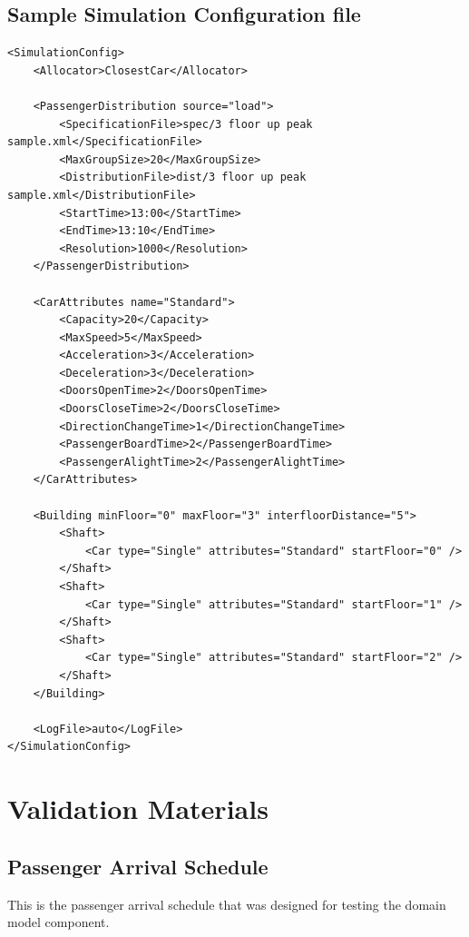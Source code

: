 \documentclass{UoYCSproject}
\begin{document}
\begin{appendices}
\subsection{Sample Simulation Configuration file}

\begin{lstlisting}
<SimulationConfig>
	<Allocator>ClosestCar</Allocator>
	
	<PassengerDistribution source="load">
		<SpecificationFile>spec/3 floor up peak sample.xml</SpecificationFile>
		<MaxGroupSize>20</MaxGroupSize>
		<DistributionFile>dist/3 floor up peak sample.xml</DistributionFile>
		<StartTime>13:00</StartTime>
		<EndTime>13:10</EndTime>
		<Resolution>1000</Resolution>
	</PassengerDistribution>
	
	<CarAttributes name="Standard">
		<Capacity>20</Capacity>
		<MaxSpeed>5</MaxSpeed>
		<Acceleration>3</Acceleration>
		<Deceleration>3</Deceleration>
		<DoorsOpenTime>2</DoorsOpenTime>
		<DoorsCloseTime>2</DoorsCloseTime>
		<DirectionChangeTime>1</DirectionChangeTime>
		<PassengerBoardTime>2</PassengerBoardTime>
		<PassengerAlightTime>2</PassengerAlightTime>
	</CarAttributes>
	
	<Building minFloor="0" maxFloor="3" interfloorDistance="5">
		<Shaft>
			<Car type="Single" attributes="Standard" startFloor="0" />
		</Shaft>
		<Shaft>
			<Car type="Single" attributes="Standard" startFloor="1" />
		</Shaft>
		<Shaft>
			<Car type="Single" attributes="Standard" startFloor="2" />
		</Shaft>
	</Building>
	
	<LogFile>auto</LogFile>
</SimulationConfig>
\end{lstlisting}

\section{Validation Materials}

\subsection{Passenger Arrival Schedule}

This is the passenger arrival schedule that was designed for testing the domain model component.


\end{appendices}
\end{document}
